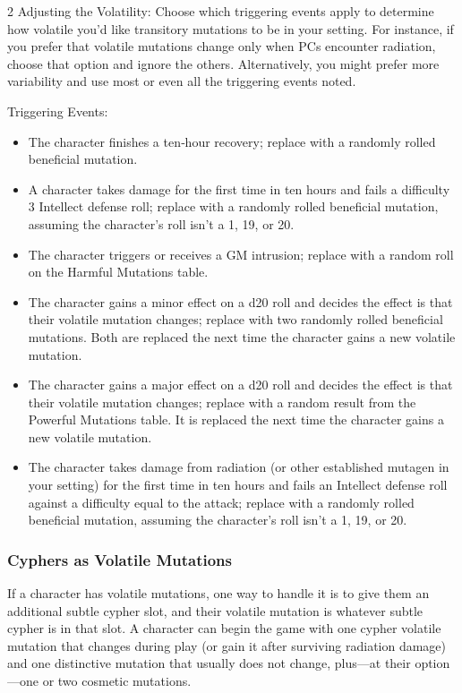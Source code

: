 \begin{multicols}{2}
Adjusting the Volatility: Choose which triggering events apply to determine how volatile you’d like transitory mutations to be in your setting. For instance, if you prefer that volatile mutations change only when PCs encounter radiation, choose that option and ignore the others. Alternatively, you might prefer more variability and use most or even all the triggering events noted.

Triggering Events:
\begin{itemize}
\item The character finishes a ten‑hour recovery; replace with a randomly rolled beneficial mutation.
\item A character takes damage for the first time in ten hours and fails a difficulty 3 Intellect defense roll; replace with a randomly rolled beneficial mutation, assuming the character’s roll isn’t a 1, 19, or 20.
\item The character triggers or receives a GM intrusion; replace with a random roll on the Harmful Mutations table.
\item The character gains a minor effect on a d20 roll and decides the effect is that their volatile mutation changes; replace with two randomly rolled beneficial mutations. Both are replaced the next time the character gains a new volatile mutation.
\item The character gains a major effect on a d20 roll and decides the effect is that their volatile mutation changes; replace with a random result from the Powerful Mutations table. It is replaced the next time the character gains a new volatile mutation.
\item The character takes damage from radiation (or other established mutagen in your setting) for the first time in ten hours and fails an Intellect defense roll against a difficulty equal to the attack; replace with a randomly rolled beneficial mutation, assuming the character’s roll isn’t a 1, 19, or 20.
\end{itemize}

\subsubsection{Cyphers as Volatile Mutations}

If a character has volatile mutations, one way to handle it is to give them an additional subtle cypher slot, and their volatile mutation is whatever subtle cypher is in that slot. A character can begin the game with one cypher volatile mutation that changes during play (or gain it after surviving radiation damage) and one distinctive mutation that usually does not change, plus—at their option—one or two cosmetic mutations. 


\end{multicols}
